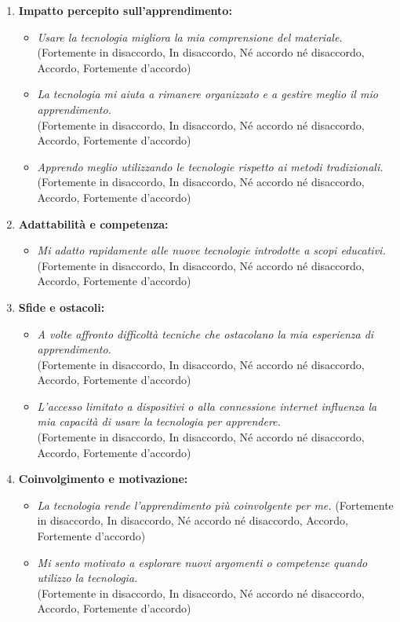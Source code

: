 \begin{enumerate}
    \item \textbf{Impatto percepito sull'apprendimento:}
    \begin{itemize}
        \item \textit{Usare la tecnologia migliora la mia comprensione del materiale.\\}
        (Fortemente in disaccordo, In disaccordo, Né accordo né disaccordo, Accordo, Fortemente d'accordo)
        \item \textit{La tecnologia mi aiuta a rimanere organizzato e a gestire meglio il mio apprendimento.}\\
        (Fortemente in disaccordo, In disaccordo, Né accordo né disaccordo, Accordo, Fortemente d'accordo)
        \item \textit{Apprendo meglio utilizzando le tecnologie rispetto ai metodi tradizionali.}\\
        (Fortemente in disaccordo, In disaccordo, Né accordo né disaccordo, Accordo, Fortemente d'accordo)
    \end{itemize}
    
    \item \textbf{Adattabilità e competenza:}
    \begin{itemize}
        \item \textit{Mi adatto rapidamente alle nuove tecnologie introdotte a scopi educativi.}\\
        (Fortemente in disaccordo, In disaccordo, Né accordo né disaccordo, Accordo, Fortemente d'accordo)
    \end{itemize}
    
    \item \textbf{Sfide e ostacoli:}
    \begin{itemize}
        \item \textit{A volte affronto difficoltà tecniche che ostacolano la mia esperienza di apprendimento.}\\
        (Fortemente in disaccordo, In disaccordo, Né accordo né disaccordo, Accordo, Fortemente d'accordo)
        \item \textit{L'accesso limitato a dispositivi o alla connessione internet influenza la mia capacità di usare la tecnologia per apprendere.}\\
        (Fortemente in disaccordo, In disaccordo, Né accordo né disaccordo, Accordo, Fortemente d'accordo)
    \end{itemize}
    
    \item \textbf{Coinvolgimento e motivazione:}
    \begin{itemize}
        \item \textit{La tecnologia rende l'apprendimento più coinvolgente per me.}
        (Fortemente in disaccordo, In disaccordo, Né accordo né disaccordo, Accordo, Fortemente d'accordo)\\
        \item \textit{Mi sento motivato a esplorare nuovi argomenti o competenze quando utilizzo la tecnologia.}\\
        (Fortemente in disaccordo, In disaccordo, Né accordo né disaccordo, Accordo, Fortemente d'accordo)
    \end{itemize}
    

\end{enumerate}
